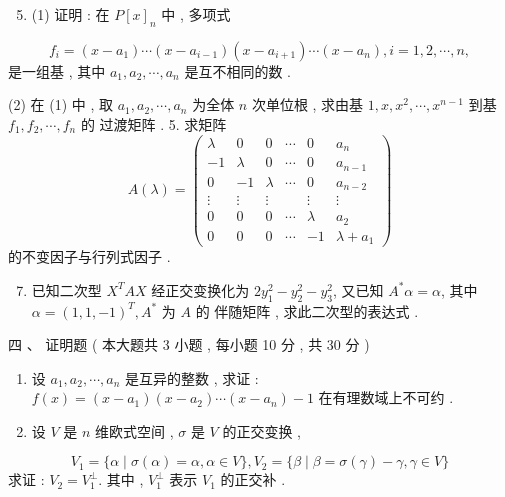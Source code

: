 \documentclass[10pt]{article}
\begin{document}
{\begin{enumerate}
  \setcounter{enumi}{4}
  \item (1)  证明 :  在  $P[x]_{n}$  中 ,  多项式 
\end{enumerate}
$$
f_{i}=\left(x-a_{1}\right) \cdots\left(x-a_{i-1}\right)\left(x-a_{i+1}\right) \cdots\left(x-a_{n}\right), i=1,2, \cdots, n,
$$
 是一组基 ,  其中  $a_{1}, a_{2}, \cdots, a_{n}$  是互不相同的数 .

(2)  在  (1)  中 ,  取  $a_{1}, a_{2}, \cdots, a_{n}$  为全体  $n$  次单位根 ,  求由基  $1, x, x^{2}, \cdots, x^{n-1}$  到基  $f_{1}, f_{2}, \cdots, f_{n}$  的   过渡矩阵 . 5.  求矩阵 
$$
A(\lambda)=\left(\begin{array}{cccccc}
\lambda & 0 & 0 & \cdots & 0 & a_{n} \\
-1 & \lambda & 0 & \cdots & 0 & a_{n-1} \\
0 & -1 & \lambda & \cdots & 0 & a_{n-2} \\
\vdots & \vdots & \vdots & & \vdots & \vdots \\
0 & 0 & 0 & \cdots & \lambda & a_{2} \\
0 & 0 & 0 & \cdots & -1 & \lambda+a_{1}
\end{array}\right)
$$
 的不变因子与行列式因子 .

\begin{enumerate}
  \setcounter{enumi}{6}
  \item  已知二次型  $X^{T} A X$  经正交变换化为  $2 y_{1}^{2}-y_{2}^{2}-y_{3}^{2}$,  又已知  $A^{*} \alpha=\alpha$,  其中  $\alpha=(1,1,-1)^{T}, A^{*}$  为  $A$  的   伴随矩阵 ,  求此二次型的表达式 .
\end{enumerate}
 四 、 证明题 ( 本大题共  3  小题 ,  每小题  10  分 ,  共  30  分 )

\begin{enumerate}
  \item  设  $a_{1}, a_{2}, \cdots, a_{n}$  是互异的整数 ,  求证 : $f(x)=\left(x-a_{1}\right)\left(x-a_{2}\right) \cdots\left(x-a_{n}\right)-1$  在有理数域上不可约 .

  \item  设  $V$  是  $n$  维欧式空间 , $\sigma$  是  $V$  的正交变换 ,

\end{enumerate}
$$
V_{1}=\{\alpha \mid \sigma(\alpha)=\alpha, \alpha \in V\}, V_{2}=\{\beta \mid \beta=\sigma(\gamma)-\gamma, \gamma \in V\}
$$
 求证 : $V_{2}=V_{1}^{\perp}$.  其中 , $V_{1}^{\perp}$  表示  $V_{1}$  的正交补 .

}
\end{document}
